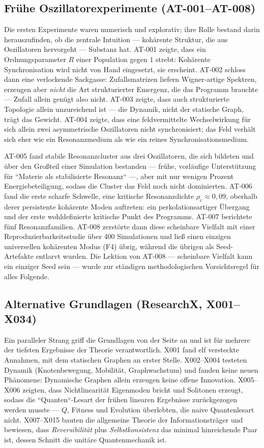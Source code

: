 \documentclass[10pt,twoside,openany]{book}
\begin{document}
\subsection{Frühe Oszillatorexperimente (AT-001--AT-008)}

Die ersten Experimente waren numerisch und explorativ; ihre Rolle bestand darin
herauszufinden, ob die zentrale Intuition --- kohärente Struktur, die aus Oszillatoren
hervorgeht --- Substanz hat. AT-001 zeigte, dass ein Ordnungsparameter $R$ einer
Population gegen $1$ strebt: Kohärente Synchronisation wird nicht von Hand eingesetzt,
sie erscheint. AT-002 schloss dann eine verlockende Sackgasse: Zufallsmatrizen liefern
Wigner-artige Spektren, erzeugen aber \emph{nicht} die Art strukturierter Emergenz, die
das Programm brauchte --- Zufall allein genügt also nicht. AT-003 zeigte, dass auch
strukturierte Topologie allein unzureichend ist --- die Dynamik, nicht der statische Graph,
trägt das Gewicht. AT-004 zeigte, dass eine feldvermittelte Wechselwirkung für sich allein
zwei asymmetrische Oszillatoren nicht synchronisiert; das Feld verhält sich eher wie ein
Resonanzmedium als wie ein reines Synchronisationsmedium.

AT-005 fand stabile Resonanzcluster aus drei Oszillatoren, die sich bildeten und über den
Großteil einer Simulation bestanden --- frühe, vorläufige Unterstützung für ``Materie als
stabilisierte Resonanz`` ---, aber mit nur wenigen Prozent Energiebeteiligung, sodass die
Cluster das Feld noch nicht dominierten. AT-006 fand die erste scharfe Schwelle, eine
kritische Resonanzdichte $\rho_c\approx0{,}09$, oberhalb derer persistente kohärente Moden
auftreten: ein perkolationsartiger Übergang und der erste wohldefinierte kritische Punkt
des Programms. AT-007 berichtete fünf Resonanzfamilien. AT-008 zerstörte dann diese
scheinbare Vielfalt mit einer Reproduzierbarkeitsstudie über 400 Simulationen und ließ
einen einzigen universellen kohärenten Modus (F4) übrig, während die übrigen als
Seed-Artefakte entlarvt wurden. Die Lektion von AT-008 --- scheinbare Vielfalt kann ein
einziger Seed sein --- wurde zur ständigen methodologischen Vorsichtsregel für alles
Folgende.

\subsection{Alternative Grundlagen (ResearchX, X001--X034)}

Ein paralleler Strang griff die Grundlagen von der Seite an und ist für mehrere der
tiefsten Ergebnisse der Theorie verantwortlich. X001 fand elf versteckte Annahmen, mit dem
statischen Graphen an erster Stelle. X002--X004 testeten Dynamik (Knotenbewegung,
Mobilität, Graphwachstum) und fanden keine neuen Phänomene: Dynamische Graphen allein
erzeugen keine offene Innovation. X005--X006 zeigten, dass Nichtlinearität Eigenmoden
bricht und Solitonen erzeugt, sodass die ``Quanten``-Lesart der frühen linearen Ergebnisse
zurückgezogen werden musste --- $Q$, Fitness und Evolution überlebten, die naive
Quantenlesart nicht. X007--X015 bauten die allgemeine Theorie der Informationsträger und
bewiesen, dass \emph{Reversibilität} plus \emph{Selbstkonsistenz} das minimal hinreichende
Paar ist, dessen Schnitt die unitäre Quantenmechanik ist.
\end{document}
